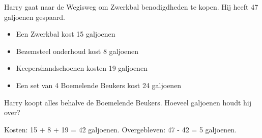 \begin{opgave}
Harry gaat naar de Wegisweg om Zwerkbal benodigdheden te kopen. Hij heeft 47 galjoenen
gespaard.

\begin{itemize}
\item Een Zwerkbal kost 15 galjoenen
\item Bezemsteel onderhoud kost 8 galjoenen  
\item Keepershandschoenen kosten 19 galjoenen
\item Een set van 4 Boemelende Beukers kost 24 galjoenen
\end{itemize}

Harry koopt alles behalve de Boemelende Beukers. Hoeveel galjoenen houdt hij over?
\end{opgave}

\begin{oplossing}
Kosten: 15 + 8 + 19 = 42 galjoenen.
Overgebleven: 47 - 42 = 5 galjoenen.
\end{oplossing}
